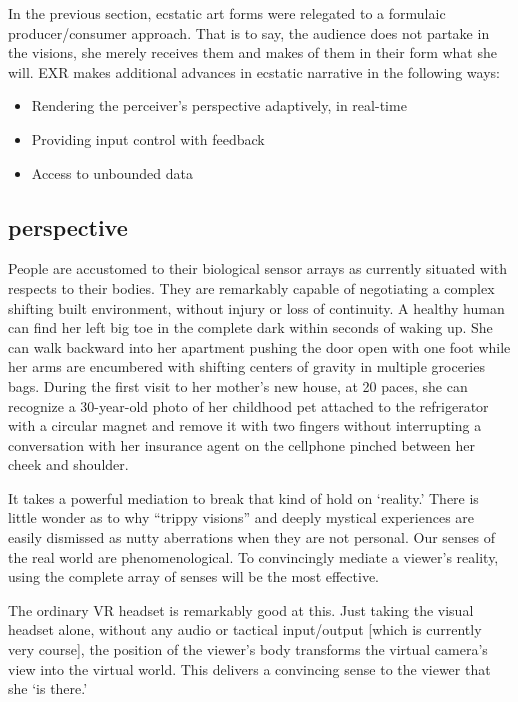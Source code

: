 \documentclass{UIdahoMastersThesis}
\begin{document}
In the previous section, ecstatic art forms were relegated to a formulaic producer/consumer approach. That is to say, the audience does not partake in the visions, she merely receives them and makes of them in their form what she will. EXR makes additional advances in ecstatic narrative in the following ways:

\begin{itemize}
  \item Rendering the perceiver's perspective adaptively, in real-time
  \item Providing input control with feedback
  \item	Access to unbounded data 
\end{itemize}

\subsection{perspective}

People are accustomed to their biological sensor arrays as currently situated with respects to their bodies. They are remarkably capable of negotiating a complex shifting built environment, without injury or loss of continuity. A healthy human can find her left big toe in the complete dark within seconds of waking up. She can walk backward into her apartment pushing the door open with one foot while her arms are encumbered with shifting centers of gravity in multiple groceries bags. During the first visit to her mother's new house, at 20 paces, she can recognize a 30-year-old photo of her childhood pet attached to the refrigerator with a circular magnet and remove it with two fingers without interrupting a conversation with her insurance agent on the cellphone pinched between her cheek and shoulder.

It takes a powerful mediation to break that kind of hold on `reality.' There is little wonder as to why ``trippy visions'' and deeply mystical experiences are easily dismissed as nutty aberrations when they are not personal. Our senses of the real world are phenomenological. To convincingly mediate a viewer's reality, using the complete array of senses will be the most effective.

The ordinary VR headset is remarkably good at this. Just taking the visual headset alone, without any audio or tactical input/output [which is currently very course], the position of the viewer's body transforms the virtual camera's view into the virtual world. This delivers a convincing sense to the viewer that she `is there.'
\end{document}
